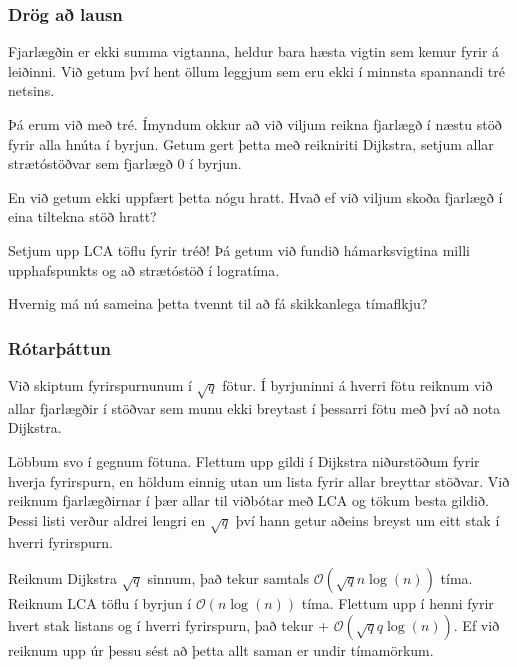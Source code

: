 {
    \frametitle{Drög að lausn}
    {
        \item<1-> Fjarlægðin er ekki summa vigtanna, heldur bara hæsta vigtin sem kemur fyrir á leiðinni. Við getum því hent öllum leggjum
            sem eru ekki í minnsta spannandi tré netsins. 
        \item<2-> Þá erum við með tré. Ímyndum okkur að við viljum reikna fjarlægð í næstu stöð fyrir alla hnúta í byrjun. Getum gert þetta
            með reikniriti Dijkstra, setjum allar strætóstöðvar sem fjarlægð $0$ í byrjun.
        \item<3-> En við getum ekki uppfært þetta nógu hratt. Hvað ef við viljum skoða fjarlægð í eina tiltekna stöð hratt?
        \item<4-> Setjum upp LCA töflu fyrir tréð! Þá getum við fundið hámarksvigtina milli upphafspunkts og að strætóstöð í logratíma.
        \item<5-> Hvernig má nú sameina þetta tvennt til að fá skikkanlega tímaflkju?
    }
}

{
    \frametitle{Rótarþáttun}
    {
        \item<1-> Við skiptum fyrirspurnunum í $\sqrt{q}$ fötur. Í byrjuninni á hverri fötu reiknum við allar fjarlægðir í stöðvar sem munu
            ekki breytast í þessarri fötu með því að nota Dijkstra.
        \item<2-> Löbbum svo í gegnum fötuna. Flettum upp gildi í Dijkstra niðurstöðum fyrir hverja fyrirspurn, en höldum einnig utan um
            lista fyrir allar breyttar stöðvar. Við reiknum fjarlægðirnar í þær allar til viðbótar með LCA og tökum besta gildið. Þessi
            listi verður aldrei lengri en $\sqrt{q}$ því hann getur aðeins breyst um eitt stak í hverri fyrirspurn.
        \item<3-> Reiknum Dijkstra $\sqrt{q}$ sinnum, það tekur samtals $\mathcal{O}(\sqrt{q}n\log(n))$ tíma. Reiknum LCA töflu í byrjun
            í $\mathcal{O}(n\log(n))$ tíma. Flettum upp í henni fyrir hvert stak listans og í hverri fyrirspurn, það tekur +
            $\mathcal{O}(\sqrt{q}q\log(n))$. Ef við reiknum upp úr þessu sést að þetta allt saman er undir tímamörkum.
    }
}


